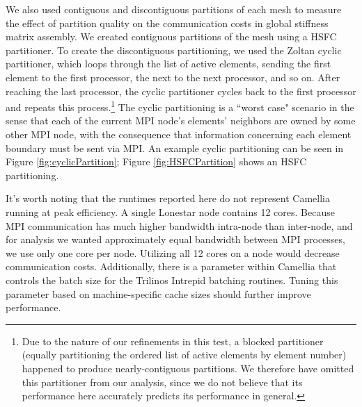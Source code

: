 \documentclass{article}
\begin{document}
We also used contiguous and discontiguous partitions of each mesh to measure the effect of partition quality on the communication costs in global stiffness matrix assembly.  We created contiguous partitions of the mesh using a HSFC partitioner.  To create the discontiguous partitioning, we used the Zoltan cyclic partitioner, which loops through the list of active elements, sending the first element to the first processor, the next to the next processor, and so on.  After reaching the last processor, the cyclic partitioner cycles back to the first processor and repeats this process.\footnote{Due to the nature of our refinements in this test, a blocked partitioner (equally partitioning the ordered list of active elements by element number) happened to produce nearly-contiguous partitions.  We therefore have omitted this partitioner from our analysis, since we do not believe that its performance here accurately predicts its performance in general.}  The cyclic partitioning is a ``worst case" scenario in the sense that each of the current MPI node's elements' neighbors are owned by some other MPI node, with the consequence that information concerning each element boundary must be sent via MPI.  An example cyclic partitioning can be seen in Figure \ref{fig:cyclicPartition}; Figure \ref{fig:HSFCPartition} shows an HSFC partitioning.

It's worth noting that the runtimes reported here do not represent Camellia running at peak efficiency.  A single Lonestar node contains 12 cores.  Because MPI communication has much higher bandwidth intra-node than inter-node, and for analysis we wanted approximately equal bandwidth between MPI processes, we use only one core per node.  Utilizing all 12 cores on a node would decrease communication costs.  Additionally, there is a parameter within Camellia that controls the batch size for the Trilinos Intrepid batching routines.  Tuning this parameter based on machine-specific cache sizes should further improve performance.
\end{document}
